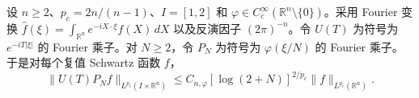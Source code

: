 设 \(n\ge2\)、\(p_c=2n/(n-1)\)、\(I=[1,2]\) 和 \(\varphi\in C_c^\infty(\mathbb R^n\setminus\{0\})\)。采用 Fourier 变换
\(\widehat f(\xi)=\int_{\mathbb R^n}e^{-iX\cdot\xi}f(X)\,dX\)
以及反演因子 \((2\pi)^{-n}\)。令 \(U(T)\) 为符号为 \(e^{-iT|\xi|}\) 的 Fourier 乘子。对 \(N\ge2\)，令 \(P_N\) 为符号为 \(\varphi(\xi/N)\) 的 Fourier 乘子。于是对每个复值 Schwartz 函数 \(f\)，
\[
 \|U(T)P_N f\|_{L^{p_c}(I\times\mathbb R^n)}
 \le C_{n,\varphi}[\log(2+N)]^{2/p_c}\|f\|_{L^{p_c}(\mathbb R^n)}.
\]
